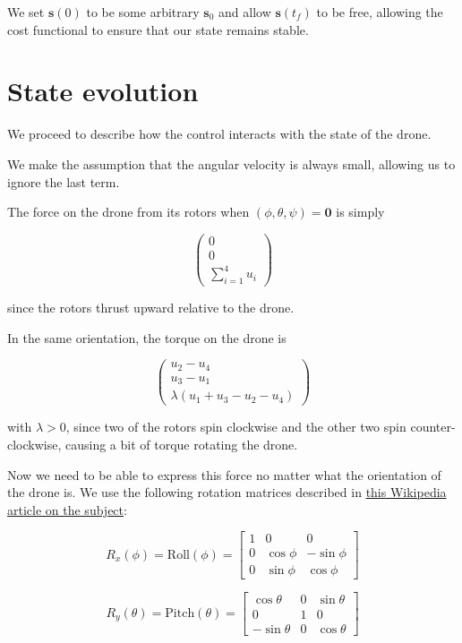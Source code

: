 \documentclass{article}
\begin{document}
We set $\mathbf{s}(0)$ to be some arbitrary $\mathbf{s}_0$ and allow $\mathbf{s}(t_f)$ to be free, allowing the cost functional to ensure that our state remains stable.

\section*{State evolution}

We proceed to describe how the control interacts with the state of the drone.


We make the assumption that the angular velocity is always small, allowing us to ignore the last term.

The force on the drone from its rotors when $(\phi, \theta, \psi) = \mathbf{0}$ is simply 

$$
\begin{pmatrix}
    0 \\ 0 \\ \sum_{i=1}^4 u_i
\end{pmatrix}
$$

since the rotors thrust upward relative to the drone. 

In the same orientation, the torque on the drone is 

$$
\begin{pmatrix}u_2 - u_4 \\ u_3 - u_1 \\ \lambda(u_1 + u_3 - u_2 - u_4) \end{pmatrix}
$$

with $\lambda >0$, since two of the rotors spin clockwise and the other two spin counter-clockwise, causing a bit of torque rotating the drone. 

Now we need to be able to express this force no matter what the orientation of the drone is. We use the following rotation matrices described in \href{https://en.wikipedia.org/wiki/Davenport_chained_rotations}{this Wikipedia article on the subject}:

\[
R_x(\phi) = \text{Roll}(\phi) =
\begin{bmatrix}
1 & 0 & 0 \\
0 & \cos\phi & -\sin\phi \\
0 & \sin\phi & \cos\phi
\end{bmatrix}
\]

\[
R_y(\theta) = \text{Pitch}(\theta) =
\begin{bmatrix}
\cos\theta & 0 & \sin\theta \\
0 & 1 & 0 \\
-\sin\theta & 0 & \cos\theta
\end{bmatrix}
\]
\end{document}
